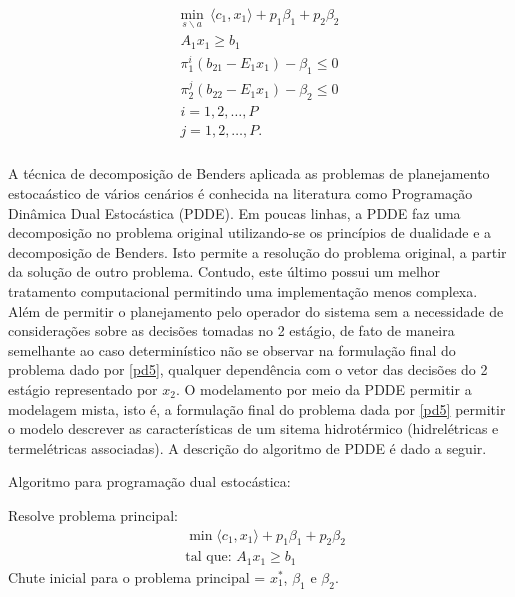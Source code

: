  \begin{align}
 \begin{aligned}
	\underset {s \backslash a} {\text{min}} \ \ \langle c_1,x_1\rangle + p_1 {\beta}_{1} + p_2 {\beta}_{2} \\
	A_1 x_1 \geq b_1 \\
	{\pi}_{1}^{i}(b_{21} - E_1x_1) - {\beta}_{1} \leq 0 \\ 
	{\pi}_{2}^{j}(b_{22} - E_1x_1) - {\beta}_{2} \leq 0 \\ 
	i = 1, 2, \dots , P \\
	j = 1, 2, \dots , P. \\
  \end{aligned}
  \label{pd5}
\end{align}

A t\'ecnica de decomposi\c c\~ao de Benders aplicada as problemas de planejamento estoca\'astico de v\'arios cen\'arios
\'e conhecida na literatura como Programa\c c\~ao Din\^amica Dual Estoc\'astica (PDDE).
Em poucas linhas, a PDDE faz uma decomposi\c c\~ao no problema original utilizando-se os princ\'ipios de dualidade e a decomposi\c c\~ao
de Benders. Isto permite a resolu\c c\~ao do problema original, a partir da solu\c c\~ao de outro
problema. Contudo, este
\'ultimo possui um melhor tratamento computacional permitindo uma implementa\c c\~ao menos complexa. Al\'em de permitir
o planejamento pelo operador do sistema sem a necessidade de considera\c c\~oes sobre as decis\~oes tomadas no 2
est\'agio, de fato de maneira semelhante ao caso determin\'istico n\~ao se observar na formula\c c\~ao final do problema
dado por \ref{pd5}, qualquer depend\^encia com o vetor das decis\~oes do 2 est\'agio representado por $x_2$. O
modelamento por meio da PDDE permitir a modelagem mista, isto \'e, a formula\c c\~ao final do problema dada por
\ref{pd5} permitir o modelo descrever as caracter\'isticas de um sitema hidrot\'ermico (hidrel\'etricas e
termel\'etricas associadas). A descri\c c\~ao do algoritmo de PDDE \'e dado a seguir.
\begin{center}
Algoritmo para programa\c c\~ao dual estoc\'astica:\\
\end{center}
Resolve problema principal:
\begin{align*}
&\min \langle c_1,x_1\rangle + p_1\beta_1  + p_2\beta_2\nonumber\\
&\mbox{tal que: }	A_1 x_1 \geq b_1
\end{align*}
Chute inicial para o problema principal = $x_1^{*}$, $\beta_1$ e $\beta_2$.\\
